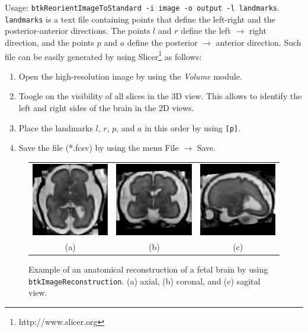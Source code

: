 \begin{description}
Usage: \texttt{btkReorientImageToStandard -i image -o output -l landmarks}.
\texttt{landmarks} is a text file containing points that define the left-right
and the posterior-anterior directions. The points $l$ and $r$ define the left
$\rightarrow$ right direction, and the points $p$ and $a$ define the posterior
$\rightarrow$ anterior direction. Such file can be easily generated by using
Slicer\footnote{http://www.slicer.org} as follows:

\begin{enumerate}
\item Open the high-resolution image by using the \textit{Volume} module.
\item Toogle on the visibility of all slices in the 3D view. This allows to
identify the left and right sides of the brain in the 2D views.
\item Place the landmarks $l$, $r$, $p$, and $a$ in this order by using
\texttt{[p]}.
\item Save the file (*.fcsv) by using the menu File $\rightarrow$ Save.
\end{enumerate}


\begin{figure}[t]
\centering
\begin{tabular}{ccc}
\includegraphics[width=0.3\columnwidth]{hr_axl.eps}&
\includegraphics[width=0.3\columnwidth]{hr_cor.eps}&
\includegraphics[width=0.3\columnwidth]{hr_sag.eps}\\
{(a)}&{(b)}&{(c)}\\
\end{tabular}
\caption{Example of an anatomical reconstruction of a fetal brain by using
\texttt{btkImageReconstruction}. (a) axial, (b) coronal, and (c) sagital view.}
\label{fig:reconstruction}
\end{figure}


\end{description}

